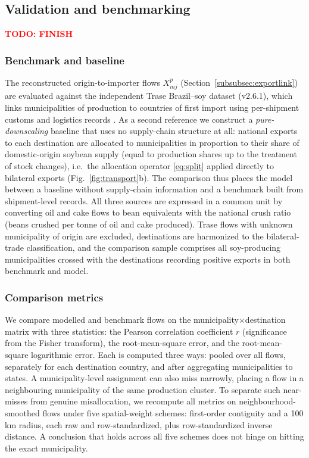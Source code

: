 \documentclass[pdflatex,sn-nature]{sn-jnl}%
\begin{document}
\subsection{Validation and benchmarking}\label{subsec:validation}
\textcolor{red}{\textbf{TODO: FINISH}}

\subsubsection{Benchmark and baseline}\label{subsubsec:benchmarks}
The reconstructed origin-to-importer flows $X^p_{mj}$
(Section~\ref{subsubsec:exportlink}) are evaluated against the independent
Trase Brazil--soy dataset (v2.6.1), which links municipalities of production
to countries of first import using per-shipment customs and logistics records
\cite{godar2015sei,escobar2020trase}. As a second reference we construct a
\emph{pure-downscaling} baseline that uses no supply-chain structure at all:
national exports to each destination are allocated to municipalities in
proportion to their share of domestic-origin soybean supply (equal to
production shares up to the treatment of stock changes), i.e.\ the allocation
operator \eqref{eq:split} applied directly to bilateral exports
(Fig.~\ref{fig:transport}b). The
comparison thus places the model between a baseline without supply-chain
information and a benchmark built from shipment-level records. All three sources are expressed in a common
unit by converting oil and cake flows to bean equivalents with the national
crush ratio (beans crushed per tonne of oil and cake produced). Trase flows
with unknown municipality of origin are excluded, destinations are harmonized
to the bilateral-trade classification, and the comparison sample comprises all
soy-producing municipalities crossed with the destinations recording positive
exports in both benchmark and model.

\subsubsection{Comparison metrics}\label{subsubsec:metrics}
We compare modelled and benchmark flows on the
municipality$\times$destination matrix with three statistics: the Pearson
correlation coefficient $r$ (significance from the Fisher transform), the
root-mean-square error, and the root-mean-square logarithmic error. Each is
computed three ways: pooled over all flows, separately for each destination
country, and after aggregating municipalities to states. A municipality-level
assignment can also miss narrowly, placing a flow in a neighbouring
municipality of the same production cluster. To separate such near-misses
from genuine misallocation, we recompute all metrics on
neighbourhood-smoothed flows under five spatial-weight schemes: first-order
contiguity and a 100\,km radius, each raw and row-standardized, plus
row-standardized inverse distance. A conclusion that holds across all five
schemes does not hinge on hitting the exact municipality.
\end{document}

